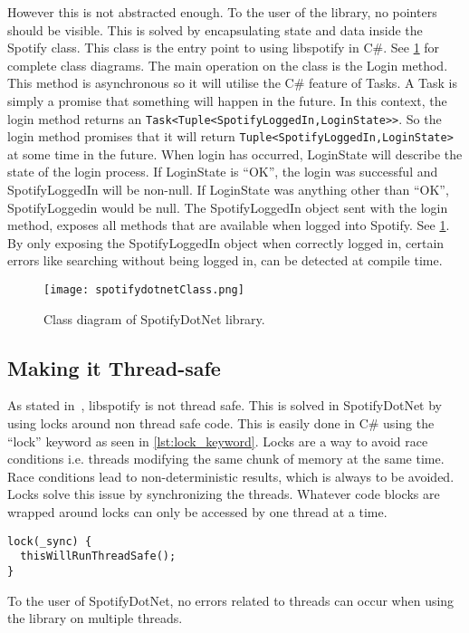 However this is not abstracted enough. To the user of the library, no pointers should be visible. This is solved by encapsulating state and data inside the Spotify class. This class is the entry point to using libspotify in C\#. See \cref{fig:spotifydotnet_class} for complete class diagrams. The main operation on the class is the Login method. This method is asynchronous so it will utilise the C\# feature of Tasks. A Task is simply a promise that something will happen in the future. In this context, the login method returns an \lstinline|Task<Tuple<SpotifyLoggedIn,LoginState>>|. So the login method promises that it will return \lstinline|Tuple<SpotifyLoggedIn,LoginState>| at some time in the future. When login has occurred, LoginState will describe the state of the login process. If LoginState is \enquote{OK}, the login was successful and SpotifyLoggedIn will be non-null. If LoginState was anything other than \enquote{OK}, SpotifyLoggedin would be null. The SpotifyLoggedIn object sent with the login method, exposes all methods that are available when logged into Spotify. See \cref{fig:spotifydotnet_class}. By only exposing the SpotifyLoggedIn object when correctly logged in, certain errors like searching without being logged in, can be detected at compile time.

\begin{figure}[hbtp]
  \centering
  \texttt{[image: spotifydotnetClass.png]}
  \caption{Class diagram of SpotifyDotNet library.}
  \label{fig:spotifydotnet_class}
\end{figure}

\subsection{Making it Thread-safe}
\label{libspotify:making_it_thread_safe}

As stated in~\cite{spotifyLibspotifyFAQ}, libspotify is not thread safe. This is solved in SpotifyDotNet by using locks around non thread safe code. This is easily done in C\# using the \enquote{lock} keyword as seen in \cref{lst:lock_keyword}. Locks are a way to avoid race conditions i.e. threads modifying the same chunk of memory at the same time. Race conditions lead to non-deterministic results, which is always to be avoided. Locks solve this issue by synchronizing the threads. Whatever code blocks are wrapped around locks can only be accessed by one thread at a time.

\begin{lstlisting}[float, floatplacement=htpb, caption = {Example of using the lock keyword in C\#. \enquote{\_sync} is an object used to store the lock state}, label = {lst:lock_keyword}]
lock(_sync) {
  thisWillRunThreadSafe();
}
\end{lstlisting}

To the user of SpotifyDotNet, no errors related to threads can occur when using the library on multiple threads.
